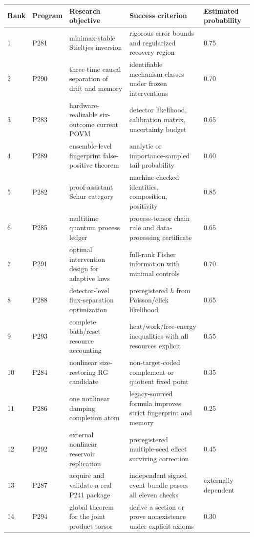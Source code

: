 \documentclass[11pt,a4paper,openany]{report}
\begin{document}
\begin{center}
\begingroup\fontsize{7}{8.4}\selectfont
\setlength{\tabcolsep}{2.5pt}
\renewcommand{\arraystretch}{1.16}
\begin{longtable}{@{}p{}p{}p{}p{}p{}@{}}
\toprule
\textbf{Rank} & \textbf{Program} & \textbf{Research objective} & \textbf{Success criterion} & \textbf{Estimated probability} \\
\midrule
\endhead
1 & P281 & minimax-stable Stieltjes inversion & rigorous error bounds and regularized recovery region & 0.75 \\
2 & P290 & three-time causal separation of drift and memory & identifiable mechanism classes under frozen interventions & 0.70 \\
3 & P283 & hardware-realizable six-outcome current POVM & detector likelihood, calibration matrix, uncertainty budget & 0.65 \\
4 & P289 & ensemble-level fingerprint false-positive theorem & analytic or importance-sampled tail probability & 0.60 \\
5 & P282 & proof-assistant Schur category & machine-checked identities, composition, positivity & 0.85 \\
6 & P285 & multitime quantum process ledger & process-tensor chain rule and data-processing certificate & 0.65 \\
7 & P291 & optimal intervention design for adaptive laws & full-rank Fisher information with minimal controls & 0.70 \\
8 & P288 & detector-level flux-separation optimization & preregistered \(h\) from Poisson/\allowbreak{}click likelihood & 0.65 \\
9 & P293 & complete bath/\allowbreak{}reset resource accounting & heat/\allowbreak{}work/\allowbreak{}free-energy inequalities with all resources explicit & 0.55 \\
10 & P284 & nonlinear size-restoring RG candidate & non-target-coded complement or quotient fixed point & 0.35 \\
11 & P286 & one nonlinear damping completion atom & legacy-sourced formula improves strict fingerprint and memory & 0.25 \\
12 & P292 & external nonlinear reservoir replication & preregistered multiple-seed effect surviving correction & 0.45 \\
13 & P287 & acquire and validate a real P241 package & independent signed event bundle passes all eleven checks & externally dependent \\
14 & P294 & global theorem for the joint product torsor & derive a section or prove nonexistence under explicit axioms & 0.30 \\
\bottomrule
\end{longtable}
\endgroup
\end{center}
\end{document}
